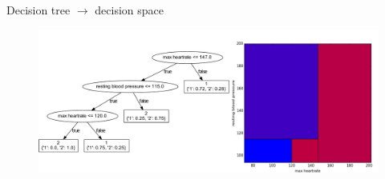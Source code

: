 \documentclass[english]{beamer}
\begin{document}
\begin{frame}{Decision tree $\rightarrow$ decision space}
	\begin{figure}
		\centering
		\includegraphics[width=\textwidth]{figures/dt_to_space.pdf}
	\end{figure}
\end{frame}
\end{document}
